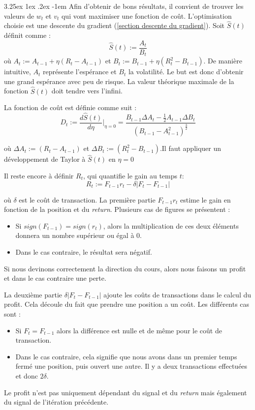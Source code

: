\documentclass[a4paper, 11pt]{article}
\makeatletter
\renewcommand\paragraph{\@startsection{paragraph}{5}{\z@}%
  {3.25ex \@plus1ex \@minus.2ex}%
  {-1em}%
  {\normalfont\normalsize\bfseries}}
\makeatother
\begin{document}
\paragraph{}
Afin d'obtenir de bons résultats, il convient de trouver les valeurs de $w_t$ et $v_t$ qui vont maximiser une fonction de coût. L'optimisation choisie
est une descente du gradient (\ref{section descente du gradient}).
Soit $\widehat{S}(t)$ définit comme :
$$\widehat{S}(t) := \frac{A_t}{B_t}$$
où $A_t := A_{t-1} + \eta (R_t - A_{t-1})$ et $B_t := B_{t-1} + \eta (R_t^2 - B_{t-1})$.
De manière intuitive, $A_t$ représente l'espérance et $B_t$ la volatilité. Le but est donc d'obtenir une grand espérance avec peu de risque. La valeur
théorique maximale de la fonction $\widehat{S}(t)$ doit tendre vers l'infini.

La fonction de coût est définie comme suit :
$$D_t := \frac{d\widehat{S}(t)}{d\eta}|_{\eta=0} = \frac{B_{t-1}\Delta A_t - \frac{1}{2} A_{t-1}\Delta B_t}{(B_{t-1} - A_{t-1}^2)^{\frac{3}{2}}}$$

où $\Delta A_t := (R_t - A_{t-1})$ et $\Delta B_t := (R_t^2 - B_{t-1})$.Il faut appliquer un développement de Taylor à $\widehat{S}(t)$ en $\eta=0$


Il reste encore à définir $R_t$, qui quantifie le gain au temps $t$:
$$R_t := F_{t-1} r_t - \delta |F_t - F_{t-1}|$$

où $\delta$ est le coût de transaction.
La première partie $F_{t-1} r_t$ estime le gain en fonction de la position et du \textit{return}. Plusieurs cas de figures se présentent :
\begin{itemize}
 \item Si $sign(F_{t-1}) = sign(r_t)$, alors la multiplication de ces deux éléments donnera un nombre supérieur ou égal à 0.
 \item Dans le cas contraire, le résultat sera négatif.
\end{itemize}
Si nous devinons correctement la direction du cours, alors nous faisons un profit et dans le cas contraire une perte.

La deuxième partie $\delta |F_t - F_{t-1}|$ ajoute les coûts de transactions dans le calcul du profit. Cela découle du fait que prendre une position a
un coût. Les différents cas sont :
\begin{itemize}
 \item Si $F_t = F_{t-1}$ alors la différence est nulle et de même pour le coût de transaction.
 \item Dans le cas contraire, cela signifie que nous avons dans un premier temps fermé une position, puis ouvert une autre. Il y a deux transactions
 effectuées et donc $2 \delta$.
\end{itemize}
Le profit n'est pas uniquement dépendant du signal et du \textit{return} mais également du signal de l'itération précédente.
\end{document}
